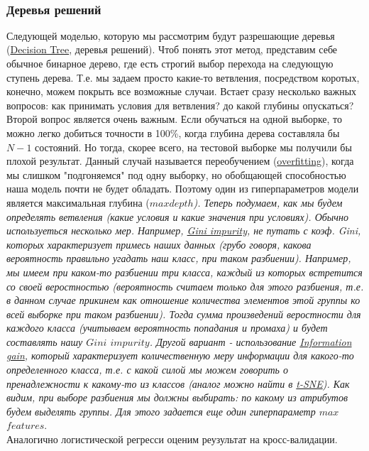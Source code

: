 \documentclass[11pt]{article}
\begin{document}
    \begin{center}
    \end{center}
    { \hspace*{\fill} \\}
    
    \subsubsection{Деревья
решений}\label{ux434ux435ux440ux435ux432ux44cux44f-ux440ux435ux448ux435ux43dux438ux439}

    Следующей моделью, которую мы рассмотрим будут разрешающие деревья
(\href{https://en.wikipedia.org/wiki/Decision_tree}{Decision Tree},
деревья решений). Чтоб понять этот метод, представим себе обычное
бинарное дерево, где есть строгий выбор перехода на следующую ступень
дерева. Т.е. мы задаем просто какие-то ветвления, посредством коротых,
конечно, можем покрыть все возможные случаи. Встает сразу несколько
важных вопросов: как принимать условия для ветвления? до какой глубины
опускаться? Второй вопрос является очень важным. Если обучаться на одной
выборке, то можно легко добиться точности в 100\%, когда глубина дерева
составляла бы \(N-1\) состояний. Но тогда, скорее всего, на тестовой
выборке мы получили бы плохой результат. Данный случай называется
переобучением
(\href{https://en.wikipedia.org/wiki/Overfitting}{overfitting}), когда
мы слишком "подгоняемся" под одну выборку, но обобщающей способностью
наша модель почти не будет обладать. Поэтому один из гиперпараметров
модели является максимальная глубина (\(max\)\emph{\(depth\)). Теперь
подумаем, как мы будем определять ветвления (какие условия и какие
значения при условиях). Обычно используеться несколько мер. Например,
\href{https://en.wikipedia.org/wiki/Decision_tree_learning\#Gini_impurity}{Gini
impurity}, не путать с коэф. Gini, которых характеризует примесь наших
данных (грубо говоря, какова вероятность правильно угадать наш класс,
при таком разбиении). Например, мы имеем при каком-то разбиении три
класса, каждый из которых встретится со своей веростностью (вероятность
считаем только для этого разбиения, т.е. в данном случае прикинем как
отношение количества элементов этой группы ко всей выборке при таком
разбиении). Тогда сумма произведений веростности для каждого класса
(учитываем вероятность попадания и промаха) и будет составлять нашу
\(Gini\) \(impurity\). Другой вариант - использование
\href{https://en.wikipedia.org/wiki/Information_gain_in_decision_trees}{Information
gain}, который характеризует количественную меру информации для
какого-то определенного класса, т.е. с какой силой мы можем говорить о
пренадлежности к какому-то из классов (аналог можно найти в
\href{https://en.wikipedia.org/wiki/Kullback\%E2\%80\%93Leibler_divergence}{t-SNE}).
Как видим, при выборе разбиения мы должны выбирать: по какому из
атрибутов будем выделять группы. Для этого задается еще один
гиперпараметр \(max\)}\(features\).\\
Аналогично логистической регресси оценим реузультат на кросс-валидации.
\end{document}
